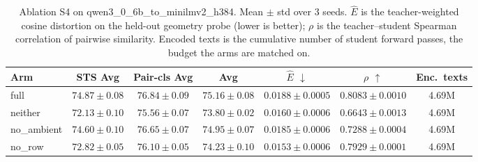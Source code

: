 \begin{table}[t]
\centering
\caption{Ablation S4 on qwen3\_0\_6b\_to\_minilmv2\_h384. Mean $\pm$ std over 3 seeds. $\hat{E}$ is the teacher-weighted cosine distortion on the held-out geometry probe (lower is better); $\rho$ is the teacher--student Spearman correlation of pairwise similarity. Encoded texts is the cumulative number of student forward passes, the budget the arms are matched on.}
\label{tab:ablation_s4_qwen3_0_6b_to_minilmv2_h384}
\begin{tabular}{lcccccc}
\toprule
Arm & STS Avg & Pair-cls Avg & Avg & $\hat{E}$ $\downarrow$ & $\rho$ $\uparrow$ & Enc.\ texts \\
\midrule
full & $74.87 \pm 0.08$ & $76.84 \pm 0.09$ & $75.16 \pm 0.08$ & $0.0188 \pm 0.0005$ & $0.8083 \pm 0.0010$ & 4.69M \\
neither & $72.13 \pm 0.10$ & $75.56 \pm 0.07$ & $73.80 \pm 0.02$ & $0.0160 \pm 0.0006$ & $0.6643 \pm 0.0013$ & 4.69M \\
no\_ambient & $74.60 \pm 0.10$ & $76.65 \pm 0.07$ & $74.95 \pm 0.07$ & $0.0185 \pm 0.0006$ & $0.7288 \pm 0.0004$ & 4.69M \\
no\_row & $72.82 \pm 0.05$ & $76.10 \pm 0.05$ & $74.23 \pm 0.10$ & $0.0153 \pm 0.0006$ & $0.7929 \pm 0.0001$ & 4.69M \\
\bottomrule
\end{tabular}
\end{table}
